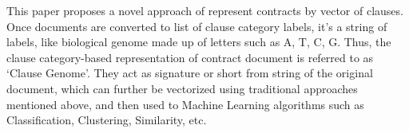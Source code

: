 \documentclass[journal]{journal}
\begin{document}
This paper proposes a novel approach of represent contracts by vector of clauses.
Once documents are converted to list of clause category labels, it's a string of labels, like biological genome made up of letters such as A, T, C, G. Thus, the clause category-based representation of contract document is referred to as `Clause Genome'.  They act as signature or short from string of the original document, which can further be vectorized using traditional approaches mentioned above, and then used to Machine Learning algorithms such as Classification, Clustering, Similarity, etc.






\end{document}
